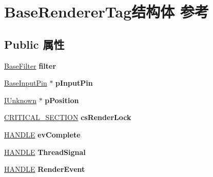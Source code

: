\hypertarget{struct_base_renderer_tag}{}\section{Base\+Renderer\+Tag结构体 参考}
\label{struct_base_renderer_tag}
\subsection*{Public 属性}
\begin{DoxyCompactItemize}
\item 
\mbox{\label{struct_base_renderer_tag_a70d3d3f9cbdcbef598ac5ca303dc0d60}} 
\hyperlink{struct_base_filter}{Base\+Filter} {\bfseries filter}
\item 
\mbox{\label{struct_base_renderer_tag_a3def44d2425815458d13c83563646414}} 
\hyperlink{struct_base_input_pin}{Base\+Input\+Pin} $\ast$ {\bfseries p\+Input\+Pin}
\item 
\mbox{\label{struct_base_renderer_tag_afad7e84eab2cc45f3c24015ba5b4d0ca}} 
\hyperlink{interface_i_unknown}{I\+Unknown} $\ast$ {\bfseries p\+Position}
\item 
\mbox{\label{struct_base_renderer_tag_a3cf13eb3357eda795b53479de9f20e15}} 
\hyperlink{struct___c_r_i_t_i_c_a_l___s_e_c_t_i_o_n}{C\+R\+I\+T\+I\+C\+A\+L\+\_\+\+S\+E\+C\+T\+I\+ON} {\bfseries cs\+Render\+Lock}
\item 
\mbox{\label{struct_base_renderer_tag_aa64eed1d9d5221d704f2417220dd322b}} 
\hyperlink{interfacevoid}{H\+A\+N\+D\+LE} {\bfseries ev\+Complete}
\item 
\mbox{\label{struct_base_renderer_tag_a231c9462e5a5fa9ca3de8aae6e875d62}} 
\hyperlink{interfacevoid}{H\+A\+N\+D\+LE} {\bfseries Thread\+Signal}
\item 
\mbox{\label{struct_base_renderer_tag_a7ae58c527242d1fe73cb044468718669}} 
\hyperlink{interfacevoid}{H\+A\+N\+D\+LE} {\bfseries Render\+Event}
\item 
\mbox{\label{struct_base_renderer_tag_afc5de221128efa13ca4053312a33259a}} 

\end{DoxyCompactItemize}
